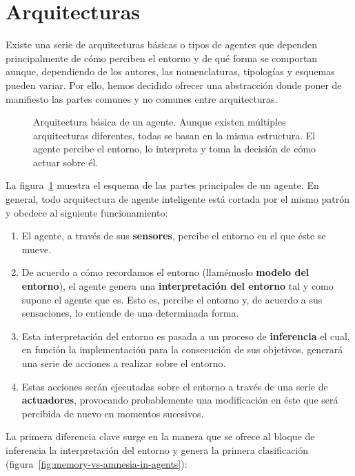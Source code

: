 \section{Arquitecturas}

Existe una serie de arquitecturas básicas o tipos de agentes que dependen principalmente de cómo perciben el entorno y de qué forma se comportan aunque, dependiendo de los autores, las nomenclaturas, tipologías y esquemas pueden variar. Por ello, hemos decidido ofrecer una abstracción donde poner de manifiesto las partes comunes y no comunes entre arquitecturas.

\begin{figure}
	\caption{Arquitectura básica de un agente. Aunque existen múltiples arquitecturas diferentes, todas se basan en la misma estructura. El agente percibe el entorno, lo interpreta y toma la decisión de cómo actuar sobre él.}
	\label{fig:agent-basic-architecture}
\end{figure}

La figura~\ref{fig:agent-basic-architecture} muestra el esquema de las partes principales de un agente. En general, todo arquitectura de agente inteligente está cortada por el mismo patrón y obedece al siguiente funcionamiento:

\begin{enumerate}
	\item El agente, a través de sus \textbf{sensores}, percibe el entorno en el que éste se mueve.
	\item De acuerdo a cómo recordamos el entorno (llamémoslo \textbf{modelo del entorno}), el agente genera una \textbf{interpretación del entorno} tal y como supone el agente que es. Esto es, percibe el entorno y, de acuerdo a sus sensaciones, lo entiende de una determinada forma.
	\item Esta interpretación del entorno es pasada a un proceso de \textbf{inferencia} el cual, en función la implementación para la consecución de sus objetivos, generará una serie de acciones a realizar sobre el entorno.
	\item Estas acciones serán ejecutadas sobre el entorno a través de una serie de \textbf{actuadores}, provocando probablemente una modificación en éste que será percibida de nuevo en momentos sucesivos.
\end{enumerate}

La primera diferencia clave surge en la manera que se ofrece al bloque de inferencia la interpretación del entorno y genera la primera clasificación (figura~\ref{fig:memory-vs-amnesia-in-agents}):

